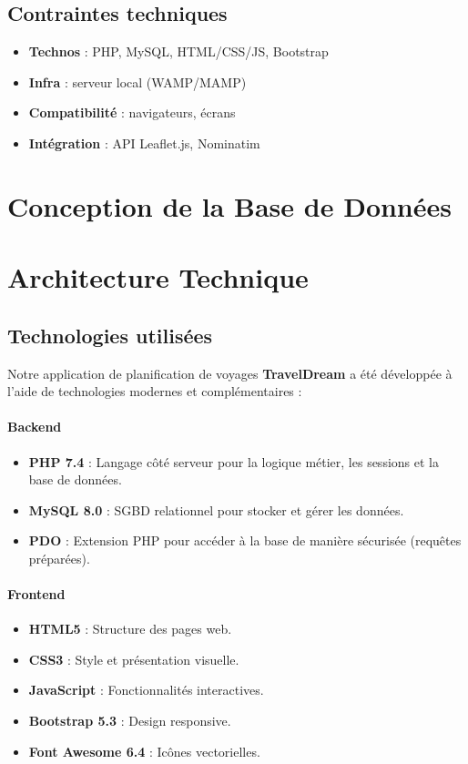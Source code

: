 \documentclass[a4paper,12pt]{article}
\begin{document}
\subsection{Contraintes techniques}
\begin{itemize}
    \item \textbf{Technos} : PHP, MySQL, HTML/CSS/JS, Bootstrap
    \item \textbf{Infra} : serveur local (WAMP/MAMP)
    \item \textbf{Compatibilité} : navigateurs, écrans
    \item \textbf{Intégration} : API Leaflet.js, Nominatim
\end{itemize}
\section{Conception de la Base de Données}
\section{Architecture Technique}

\subsection{Technologies utilisées}
Notre application de planification de voyages \textbf{TravelDream} a été développée à l’aide de technologies modernes et complémentaires :

\paragraph{Backend}
\begin{itemize}
    \item \textbf{PHP 7.4} : Langage côté serveur pour la logique métier, les sessions et la base de données.
    \item \textbf{MySQL 8.0} : SGBD relationnel pour stocker et gérer les données.
    \item \textbf{PDO} : Extension PHP pour accéder à la base de manière sécurisée (requêtes préparées).
\end{itemize}

\paragraph{Frontend}
\begin{itemize}
    \item \textbf{HTML5} : Structure des pages web.
    \item \textbf{CSS3} : Style et présentation visuelle.
    \item \textbf{JavaScript} : Fonctionnalités interactives.
    \item \textbf{Bootstrap 5.3} : Design responsive.
    \item \textbf{Font Awesome 6.4} : Icônes vectorielles.
\end{itemize}
\end{document}
